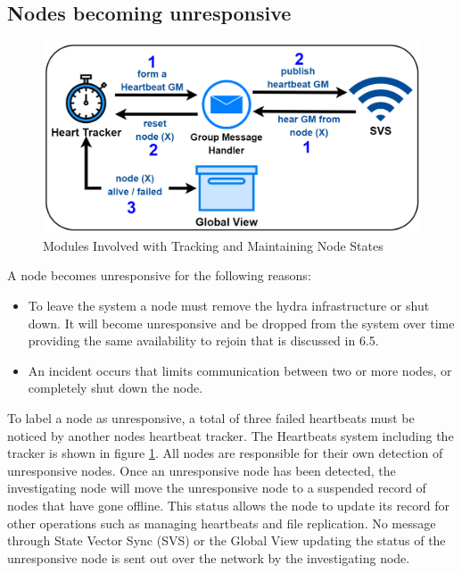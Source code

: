 \subsection{Nodes becoming unresponsive} \label{sec:nodes-unresponsive}
\begin{figure}[!ht]
    \centering
    \includegraphics[width=\columnwidth]{visuals/heartbeats-sys.png}
    \caption{Modules Involved with Tracking and Maintaining Node States}
    \label{fig:heartbeats-sys}
\end{figure}

A node becomes unresponsive for the following reasons:

\begin{itemize}
    \item To leave the system a node must remove the hydra infrastructure or shut down. It will become unresponsive and be dropped from the system over time providing the same availability to rejoin that is discussed in 6.5.
    \item An incident occurs that limits communication between two or more nodes, or completely shut down the node.
\end{itemize}

To label a node as unresponsive, a total of three failed heartbeats must be noticed by another nodes heartbeat tracker. The Heartbeats system including the tracker is shown in figure \ref{fig:heartbeats-sys}. All nodes are responsible for their own detection of unresponsive nodes. Once an unresponsive node has been detected, the investigating node will move the unresponsive node to a suspended record of nodes that have gone offline. This status allows the node to update its record for other operations such as managing heartbeats and file replication. No message through State Vector Sync (SVS) or the Global View updating the status of the unresponsive node is sent out over the network by the investigating node.

